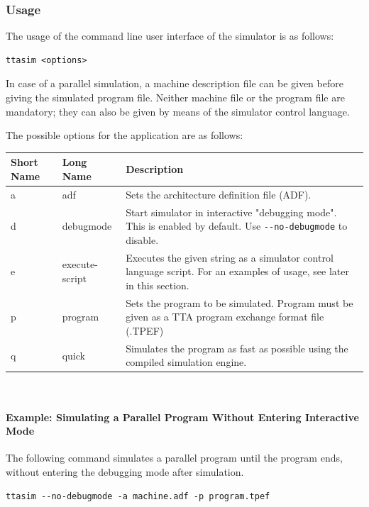 \documentclass[a4paper,twoside]{tceusermanual}
\begin{document}
\subsubsection{Usage}

The usage of the command line user interface of the simulator is as follows:

\begin{verbatim}
ttasim <options>
\end{verbatim}

In case of a parallel simulation, a machine description file can be given before
giving the simulated program file. Neither machine file or the program file are mandatory;
they can also be given by means of the simulator control language.

The possible options for the application are as follows:\\

\begin{tabular}{p{}p{}
                p{}}
\textbf{Short Name} &\textbf{Long Name} &\textbf{Description} \\
\hline
a & adf & Sets the architecture definition file (ADF). \\
d & debugmode & Start simulator in interactive "debugging mode". This is enabled by default. Use \verb|--no-debugmode| to disable.\\
e & execute-script & Executes the given string as a simulator control language script. For an examples of usage, see later in this section. \\
p & program & Sets the program to be simulated. Program must be given as a TTA program exchange format file (.TPEF) \\
q & quick & Simulates the program as fast as possible using the compiled simulation engine. \\
\end{tabular}\\



\paragraph{Example: Simulating a Parallel Program Without Entering Interactive
Mode}

The following command simulates a parallel program until the program ends,
without entering the debugging mode after simulation.

\begin{verbatim}
ttasim --no-debugmode -a machine.adf -p program.tpef
\end{verbatim}
\end{document}
